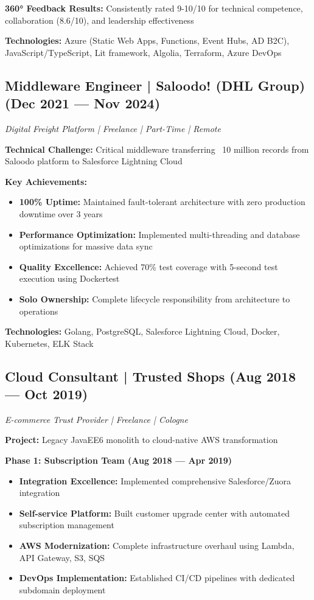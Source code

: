 \documentclass[10pt,a4paper]{article}
\begin{document}
\textbf{360° Feedback Results:} Consistently rated 9-10/10 for technical competence, collaboration (8.6/10), and leadership effectiveness

\textbf{Technologies:} Azure (Static Web Apps, Functions, Event Hubs, AD B2C), JavaScript/TypeScript, Lit framework, Algolia, Terraform, Azure DevOps

\subsection{Middleware Engineer | Saloodo! (DHL Group) (Dec 2021 — Nov 2024)}
\textit{Digital Freight Platform | Freelance | Part-Time | Remote}

\textbf{Technical Challenge:} Critical middleware transferring ~10 million records from Saloodo platform to Salesforce Lightning Cloud

\textbf{Key Achievements:}
\begin{itemize}[leftmargin=*,noitemsep,topsep=0pt]
\item \textbf{100\% Uptime:} Maintained fault-tolerant architecture with zero production downtime over 3 years
\item \textbf{Performance Optimization:} Implemented multi-threading and database optimizations for massive data sync
\item \textbf{Quality Excellence:} Achieved 70\% test coverage with 5-second test execution using Dockertest
\item \textbf{Solo Ownership:} Complete lifecycle responsibility from architecture to operations
\end{itemize}

\textbf{Technologies:} Golang, PostgreSQL, Salesforce Lightning Cloud, Docker, Kubernetes, ELK Stack

\subsection{Cloud Consultant | Trusted Shops (Aug 2018 — Oct 2019)}
\textit{E-commerce Trust Provider | Freelance | Cologne}

\textbf{Project:} Legacy JavaEE6 monolith to cloud-native AWS transformation

\textbf{Phase 1: Subscription Team (Aug 2018 — Apr 2019)}
\begin{itemize}[leftmargin=*,noitemsep,topsep=0pt]
\item \textbf{Integration Excellence:} Implemented comprehensive Salesforce/Zuora integration
\item \textbf{Self-service Platform:} Built customer upgrade center with automated subscription management
\item \textbf{AWS Modernization:} Complete infrastructure overhaul using Lambda, API Gateway, S3, SQS
\item \textbf{DevOps Implementation:} Established CI/CD pipelines with dedicated subdomain deployment
\end{itemize}
\end{document}
